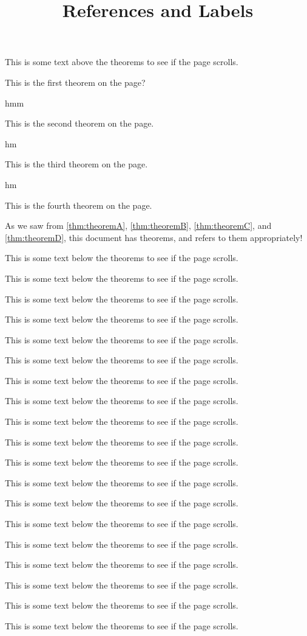 \documentclass{ximera}
\begin{document}
\title{References and Labels}

This is some text above the theorems to see if the page scrolls.

\begin{theorem}
\label{thm:theoremA} This is the first theorem on the page?
\end{theorem}

hmm

\begin{theorem}
\label{thm:theoremB} This is the second theorem on the page.
\end{theorem}

hm

\begin{theorem}
\label{thm:theoremC} This is the third theorem on the page.
\end{theorem}

hm


\begin{theorem}
\label{thm:theoremD} This is the fourth theorem on the page.
\end{theorem}

As we saw from \autoref{thm:theoremA}, \autoref{thm:theoremB}, \autoref{thm:theoremC}, and \autoref{thm:theoremD}, this document has theorems, and refers to them appropriately!

This is some text below the theorems to see if the page scrolls.

This is some text below the theorems to see if the page scrolls.

This is some text below the theorems to see if the page scrolls.

This is some text below the theorems to see if the page scrolls.

This is some text below the theorems to see if the page scrolls.

This is some text below the theorems to see if the page scrolls.

This is some text below the theorems to see if the page scrolls.

This is some text below the theorems to see if the page scrolls.

This is some text below the theorems to see if the page scrolls.

This is some text below the theorems to see if the page scrolls.

This is some text below the theorems to see if the page scrolls.

This is some text below the theorems to see if the page scrolls.

This is some text below the theorems to see if the page scrolls.

This is some text below the theorems to see if the page scrolls.

This is some text below the theorems to see if the page scrolls.

This is some text below the theorems to see if the page scrolls.

This is some text below the theorems to see if the page scrolls.

This is some text below the theorems to see if the page scrolls.

This is some text below the theorems to see if the page scrolls.
\end{document}
